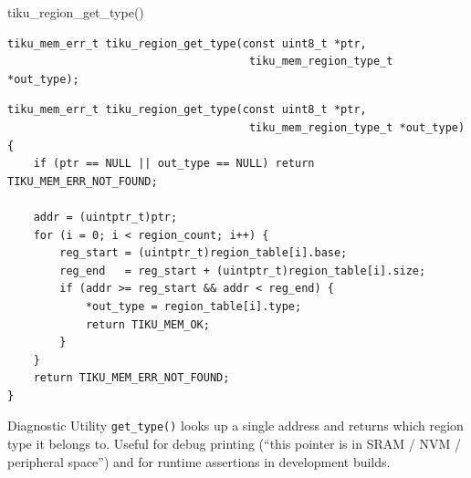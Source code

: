 \documentclass[aspectratio=169, 10pt]{beamer}
\begin{document}
\begin{frame}[fragile]{tiku\_region\_get\_type()}
\begin{lstlisting}[style=cstyle]
tiku_mem_err_t tiku_region_get_type(const uint8_t *ptr,
                                     tiku_mem_region_type_t *out_type);
\end{lstlisting}

\begin{lstlisting}[style=cstyle, title={kernel/memory/tiku\_region.c}]
tiku_mem_err_t tiku_region_get_type(const uint8_t *ptr,
                                     tiku_mem_region_type_t *out_type) {
    if (ptr == NULL || out_type == NULL) return TIKU_MEM_ERR_NOT_FOUND;

    addr = (uintptr_t)ptr;
    for (i = 0; i < region_count; i++) {
        reg_start = (uintptr_t)region_table[i].base;
        reg_end   = reg_start + (uintptr_t)region_table[i].size;
        if (addr >= reg_start && addr < reg_end) {
            *out_type = region_table[i].type;
            return TIKU_MEM_OK;
        }
    }
    return TIKU_MEM_ERR_NOT_FOUND;
}
\end{lstlisting}

\vspace{0.3em}
\begin{block}{Diagnostic Utility}
\texttt{get\_type()} looks up a single address and returns which region
type it belongs to. Useful for debug printing (``this pointer is in
SRAM / NVM / peripheral space'') and for runtime assertions in
development builds.
\end{block}
\end{frame}
\end{document}
